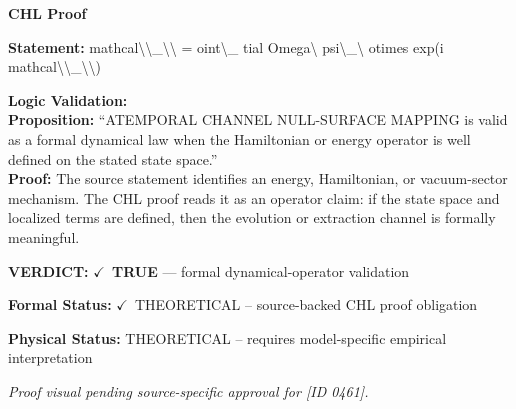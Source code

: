 \vspace{0.45em}
\noindent\textbf{CHL Proof}\par
\textbf{Statement:} mathcal\textbackslash{}\textbackslash{}\_\textbackslash{}\textbackslash{} = oint\textbackslash{}\_ tial Omega\textbackslash{} psi\textbackslash{}\_\textbackslash{} otimes exp(i mathcal\textbackslash{}\textbackslash{}\_\textbackslash{}\textbackslash{})

\textbf{Logic Validation:}\\
\textbf{Proposition:} ``ATEMPORAL CHANNEL NULL-SURFACE MAPPING is valid as a formal dynamical law when the
Hamiltonian or energy operator is well defined on the stated state space.''\\
\textbf{Proof:} The source statement identifies an energy, Hamiltonian, or vacuum-sector mechanism. The
CHL proof reads it as an operator claim: if the state space and localized terms are
defined, then the evolution or extraction channel is formally meaningful.

\textbf{VERDICT:} \ensuremath{\checkmark}\ \textbf{TRUE} --- formal dynamical-operator validation

\textbf{Formal Status:} \ensuremath{\checkmark}\ THEORETICAL -- source-backed CHL proof obligation

\textbf{Physical Status:} THEORETICAL -- requires model-specific empirical interpretation
\par\vspace{0.45em}
\par
\vfill
\begingroup\footnotesize\itshape
Proof visual pending source-specific approval for [ID 0461].
\par\endgroup
\vfill
\endgroup
\endgroup
